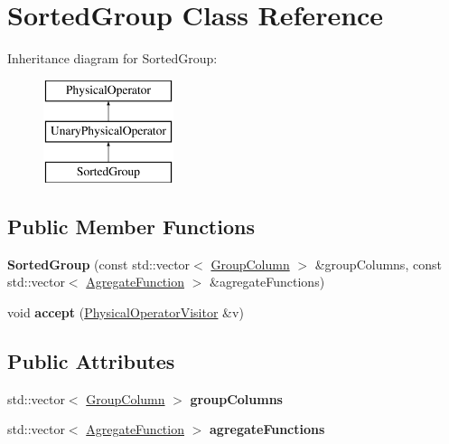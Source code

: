 \hypertarget{class_sorted_group}{\section{Sorted\+Group Class Reference}
\label{class_sorted_group}
}
Inheritance diagram for Sorted\+Group\+:\begin{figure}[H]
\begin{center}
\leavevmode
\includegraphics[height=3.000000cm]{class_sorted_group}
\end{center}
\end{figure}
\subsection*{Public Member Functions}
\begin{DoxyCompactItemize}
\item 
\hypertarget{class_sorted_group_a5f6798dee7afc557e3510b32558cab05}{{\bfseries Sorted\+Group} (const std\+::vector$<$ \hyperlink{class_group_column}{Group\+Column} $>$ \&group\+Columns, const std\+::vector$<$ \hyperlink{class_agregate_function}{Agregate\+Function} $>$ \&agregate\+Functions)}\label{class_sorted_group_a5f6798dee7afc557e3510b32558cab05}

\item 
\hypertarget{class_sorted_group_aba97fdc1722858dc33723052e6bc7e5a}{void {\bfseries accept} (\hyperlink{class_physical_operator_visitor}{Physical\+Operator\+Visitor} \&v)}\label{class_sorted_group_aba97fdc1722858dc33723052e6bc7e5a}

\end{DoxyCompactItemize}
\subsection*{Public Attributes}
\begin{DoxyCompactItemize}
\item 
\hypertarget{class_sorted_group_af4ccedafc52d06be95d88eec6e235ba2}{std\+::vector$<$ \hyperlink{class_group_column}{Group\+Column} $>$ {\bfseries group\+Columns}}\label{class_sorted_group_af4ccedafc52d06be95d88eec6e235ba2}

\item 
\hypertarget{class_sorted_group_ab3d59776a6c7516df046d09b0bcd2f4e}{std\+::vector$<$ \hyperlink{class_agregate_function}{Agregate\+Function} $>$ {\bfseries agregate\+Functions}}\label{class_sorted_group_ab3d59776a6c7516df046d09b0bcd2f4e}

\end{DoxyCompactItemize}


